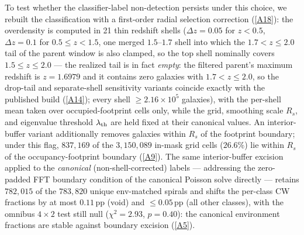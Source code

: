 \documentclass[twocolumn,linenumbers]{aastex702}
\newcommand{\repoBase}{https://github.com/Hubify-Projects/bigbounce/blob/main}
\begin{document}
To test whether the classifier-label non-detection persists under this
choice, we rebuilt the classification with a first-order radial
selection correction
(\href{\repoBase/pipelines/p5\_desi\_chirality/scripts/16\_cosmic\_web\_zshell\_corrected.py}{[A18]}): the
overdensity is computed in 21 thin redshift shells ($\Delta z = 0.05$
for $z<0.5$, $\Delta z = 0.1$ for $0.5 \le z < 1.5$, one merged
$1.5$--$1.7$ shell into which the $1.7 < z \le 2.0$ tail of
the parent window is also clamped, so the top shell nominally
covers $1.5 \le z \le 2.0$ --- the realized tail is in fact
\emph{empty}: the filtered parent's maximum redshift is
$z = 1.6979$ and it contains zero galaxies with $1.7 < z \le 2.0$,
so the drop-tail and separate-shell sensitivity variants coincide
exactly with the published build
(\href{\repoBase/pipelines/p5\_desi\_chirality/outputs/24\_r24conf\_pod\_session.json}{[A14]});
every shell $\ge 2.16\times10^5$
galaxies), with the
per-shell mean taken over occupied-footprint cells only, while the
grid, smoothing scale $R_s$, and eigenvalue threshold
$\lambda_{\rm th}$ are held fixed at their canonical values. An
interior-buffer variant additionally removes galaxies within $R_s$ of
the footprint boundary; under this flag, $837{,}169$ of the
$3{,}150{,}089$ in-mask grid cells ($26.6\%$) lie within $R_s$ of the
occupancy-footprint boundary
(\href{\repoBase/pipelines/p5\_desi\_chirality/outputs/22\_r24conf\_local\_batch.json}{[A9]}). The same interior-buffer excision applied to
the \emph{canonical} (non-shell-corrected) labels — addressing the
zero-padded FFT boundary condition of the canonical Poisson solve
directly — retains $782{,}015$ of the $783{,}820$ unique env-matched
spirals and shifts the per-class CW fractions by at most $0.11$\,pp
(void) and $\le 0.05$\,pp (all other classes), with the omnibus
$4\times2$ test still null ($\chi^2 = 2.93$, $p = 0.40$): the
canonical environment fractions are stable against boundary
excision
(\href{\repoBase/pipelines/p5\_desi\_chirality/outputs/21\_r23conf\_meta\_closures.json}{[A5]}).
\end{document}

